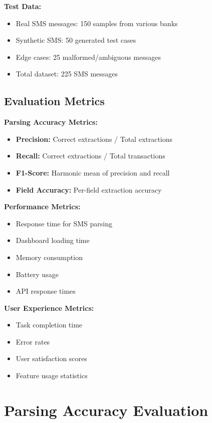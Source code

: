 \documentclass[11pt,a4paper]{report}
\begin{document}
\textbf{Test Data:}
\begin{itemize}
    \item Real SMS messages: 150 samples from various banks
    \item Synthetic SMS: 50 generated test cases
    \item Edge cases: 25 malformed/ambiguous messages
    \item Total dataset: 225 SMS messages
\end{itemize}

\subsection{Evaluation Metrics}

\textbf{Parsing Accuracy Metrics:}
\begin{itemize}
    \item \textbf{Precision:} Correct extractions / Total extractions
    \item \textbf{Recall:} Correct extractions / Total transactions
    \item \textbf{F1-Score:} Harmonic mean of precision and recall
    \item \textbf{Field Accuracy:} Per-field extraction accuracy
\end{itemize}

\textbf{Performance Metrics:}
\begin{itemize}
    \item Response time for SMS parsing
    \item Dashboard loading time
    \item Memory consumption
    \item Battery usage
    \item API response times
\end{itemize}

\textbf{User Experience Metrics:}
\begin{itemize}
    \item Task completion time
    \item Error rates
    \item User satisfaction scores
    \item Feature usage statistics
\end{itemize}

\section{Parsing Accuracy Evaluation}
\end{document}
